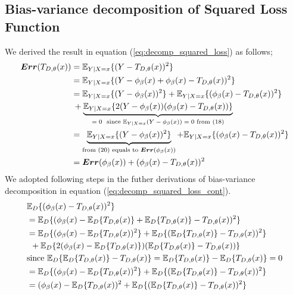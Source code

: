 \subsection{Bias-variance decomposition of Squared Loss Function}
\label{app:bias_var_decomp}
We derived the result in equation (\ref{eq:decomp_squared_loss}) as follows;
\begin{align}
\boldsymbol{Err}(T_{D, \theta}(x)) & = \mathbb{E}_{Y|X=x}\{(Y-T_{D,\theta}(x))^2\} \notag \\
							  & = \mathbb{E}_{Y|X=x}\{(Y -\phi_{\beta}(x) +\phi_{\beta}(x) -T_{D,\theta}(x))^2\} \notag \\
							  & = \mathbb{E}_{Y|X=x}\{(Y-\phi_{\beta}(x))^2\} + \mathbb{E}_{Y|X=x}\{(\phi_{\beta}(x)-T_{D,\theta}(x))^2\} \notag \\
							  &	\: + \underbrace{\mathbb{E}_{Y|X=x}\{2(Y-\phi_{\beta}(x))(\phi_{\beta}(x)-T_{D,\theta}(x))\}}_\text{$=0$ \ since $ \mathbb{E}_{Y|X=x}(Y-\phi_{\beta}(x)) = 0$ from $(18)$}  \notag \\
							  & = \underbrace{\mathbb{E}_{Y|X=x}\{(Y-\phi_{\beta}(x))^2\}}_\text{from $(20)$ equals to $\boldsymbol{Err}(\phi_{\beta}(x))$} + \mathbb{E}_{Y|X=x}\{(\phi_{\beta}(x)-T_{D,\theta}(x))^2\}  \notag \\
							  & = \boldsymbol{Err}(\phi_{\beta}(x)) + (\phi_{\beta}(x)-T_{D,\theta}(x))^2\notag
\end{align}
We adopted following steps in the futher derivations of bias-variance decomposition in equation (\ref{eq:decomp_squared_loss_cont}).
\begin{align}
& \mathbb{E}_{D}\{(\phi_{\beta}(x) - T_{D,\theta}(x))^2 \} \notag \\
& = \mathbb{E}_{D}\{(\phi_{\beta}(x) - \mathbb{E}_{D}\{T_{D,\theta}(x)\} + \mathbb{E}_{D}\{T_{D,\theta}(x)\} - T_{D,\theta}(x))^2\} \notag \\
& = \mathbb{E}_{D}\{(\phi_{\beta}(x) - \mathbb{E}_{D}\{T_{D,\theta}(x))^2\} 
	+ \mathbb{E}_{D}\{(\mathbb{E}_{D}\{T_{D,\theta}(x)\} - T_{D,\theta}(x))^2\} \notag \\
&\: \: + \mathbb{E}_{D}\{2(\phi_{\beta}(x) - \mathbb{E}_{D}\{T_{D,\theta}(x)\})(\mathbb{E}_{D}\{T_{D,\theta}(x)\} - T_{D,\theta}(x))\} \notag \\
& \text{since $\mathbb{E}_{D}\{\mathbb{E}_{D}\{T_{D,\theta}(x)\} - T_{D,\theta}(x)\} = \mathbb{E}_{D}\{T_{D,\theta}(x)\} - \mathbb{E}_{D}\{T_{D,\theta}(x)\} = 0$} \notag \\
& = \mathbb{E}_{D}\{(\phi_{\beta}(x) - \mathbb{E}_{D}\{T_{D,\theta}(x))^2\} 
	+ \mathbb{E}_{D}\{(\mathbb{E}_{D}\{T_{D,\theta}(x)\} - T_{D,\theta}(x))^2\} \notag \\
& = (\phi_{\beta}(x) - \mathbb{E}_{D}\{T_{D,\theta}(x))^2 + \mathbb{E}_{D}\{(\mathbb{E}_{D}\{T_{D,\theta}(x)\} - T_{D,\theta}(x))^2\}\notag
\end{align}

